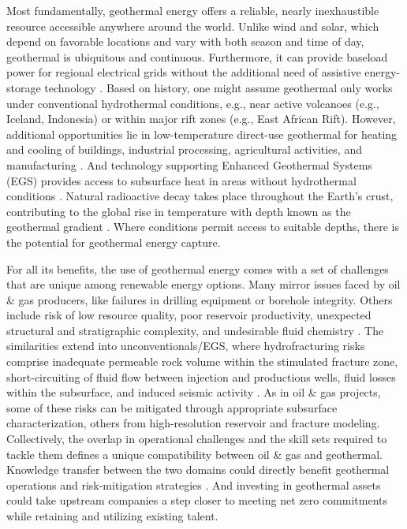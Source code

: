 Most fundamentally, geothermal energy offers a reliable, nearly inexhaustible resource accessible anywhere around the world. Unlike wind and solar, which depend on favorable locations and vary with both season and time of day, geothermal is ubiquitous and continuous. Furthermore, it can provide baseload power for regional electrical grids without the additional need of assistive energy-storage technology \citep{tester_future_2006}. Based on history, one might assume geothermal only works under conventional hydrothermal conditions, e.g., near active volcanoes (e.g., Iceland, Indonesia) or within major rift zones (e.g., East African Rift). However, additional opportunities lie in low-temperature direct-use geothermal for heating and cooling of buildings, industrial processing, agricultural activities, and manufacturing \citep[p.\ 9]{glassley_geothermal_2015}. And technology supporting Enhanced Geothermal Systems (EGS) provides access to subsurface heat in areas without hydrothermal conditions \citep{tester_future_2006}. Natural radioactive decay takes place throughout the Earth’s crust, contributing to the global rise in temperature with depth known as the geothermal gradient \citep[p.\ 279]{fowler_solid_2005}. Where conditions permit access to suitable depths, there is the potential for geothermal energy capture.

For all its benefits, the use of geothermal energy comes with a set of challenges that are unique among renewable energy options. Many mirror issues faced by oil \& gas producers, like failures in drilling equipment or borehole integrity. Others include risk of low resource quality, poor reservoir productivity, unexpected structural and stratigraphic complexity, and undesirable fluid chemistry \citep{beckers_low-temperature_2016, hadi_resource_2010}. The similarities extend into unconventionals/EGS, where hydrofracturing risks comprise inadequate permeable rock volume within the stimulated fracture zone, short-circuiting of fluid flow between injection and productions wells, fluid losses within the subsurface, and induced seismic activity \citep{jelacic_evaluation_2008,pan_establishment_2019}. As in oil \& gas projects, some of these risks can be mitigated through appropriate subsurface characterization, others from high-resolution reservoir and fracture modeling. Collectively, the overlap in operational challenges and the skill sets required to tackle them defines a unique compatibility between oil \& gas and geothermal. Knowledge transfer between the two domains could directly benefit geothermal operations and risk-mitigation strategies \citep{petty_synergies_2009}. And investing in geothermal assets could take upstream companies a step closer to meeting net zero commitments while retaining and utilizing existing talent.

